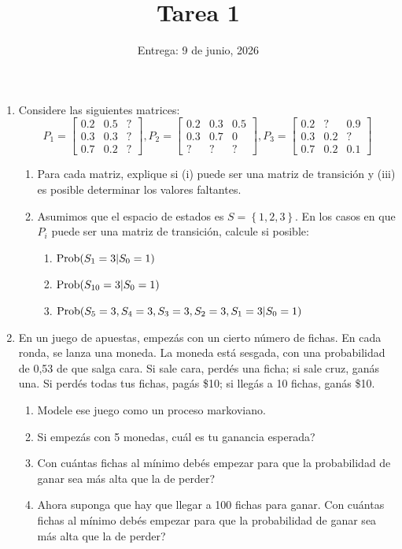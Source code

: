\documentclass[12pt]{article}
\begin{document}
\title{Tarea 1}
\author{Entrega: 9 de junio, 2026}
\date{}
\maketitle
\begin{enumerate}
\item Considere las siguientes matrices:
    $$
    P_1 = \left[ \begin{array}{ccc}
    0.2 & 0.5 & ? \\
    0.3 & 0.3 & ? \\
    0.7 & 0.2 & ? 
    \end{array}\right], P_2 = \left[ \begin{array}{ccc}
    0.2 & 0.3 & 0.5 \\
    0.3 & 0.7 & 0 \\
    ? & ? & ? 
    \end{array}\right], P_3 = \left[ \begin{array}{ccc}
    0.2 & ? & 0.9 \\
    0.3 & 0.2 & ? \\
    0.7 & 0.2 & 0.1 
    \end{array}\right]
    $$
    \begin{enumerate}
    \item Para cada matriz, explique si (i) puede ser una matriz de transición y (iii) es posible determinar los valores faltantes.
    \item Asumimos que el espacio de estados es $S = \left\{1,2,3\right\}$. En los casos en que $P_i$ puede ser una matriz de transición, calcule si posible:
    \begin{enumerate}
    \item ${\rm Prob}(S_1 = 3|S_0 = 1)$
    \item ${\rm Prob}(S_{10} =3|S_0 = 1)$
    \item ${\rm Prob}(S_5 = 3, S_4 = 3, S_3 = 3, S_2 = 3, S_1 = 3 | S_0 = 1)$
    \end{enumerate}
    \end{enumerate}
\item En un juego de apuestas, empezás con un cierto número de fichas. En cada ronda, se lanza una moneda. La moneda está sesgada, con una probabilidad de 0,53 de que salga cara. Si sale cara, perdés una ficha; si sale cruz, ganás una. Si perdés todas tus fichas, pagás \$10; si llegás a 10 fichas, ganás \$10.
    \begin{enumerate}
    \item Modele ese juego como un proceso markoviano.
    \item Si empezás con 5 monedas, \textquestiondown cuál es tu ganancia esperada?
    \item \textquestiondown Con cuántas fichas al mínimo debés empezar para que la probabilidad de ganar sea más alta que la de perder?
    \item Ahora suponga que hay que llegar a 100 fichas para ganar. \textquestiondown Con cuántas fichas al mínimo debés empezar para que la probabilidad de ganar sea más alta que la de perder?
    \end{enumerate}


\end{enumerate}
\end{document}
